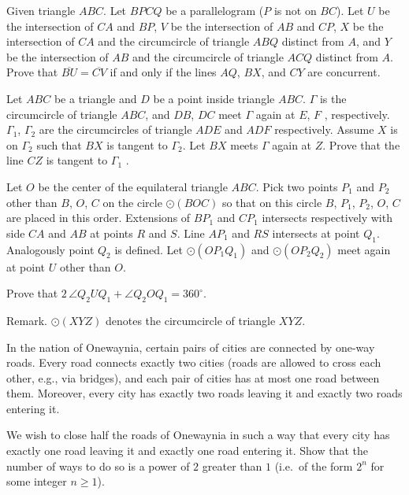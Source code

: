 \documentclass[11pt]{scrartcl}
\begin{document}
\begin{problem}[302438226120877]
	Given triangle $ABC$. Let $BPCQ$ be a parallelogram ($P$ is not on $BC$). Let $U$ be the intersection of $CA$ and $BP$, $V$ be the intersection of $AB$ and $CP$, $X$ be the intersection of $CA$ and the circumcircle of triangle $ABQ$ distinct from $A$, and $Y$ be the intersection of $AB$ and the circumcircle of triangle $ACQ$ distinct from $A$.
Prove that $\overline{BU} = \overline{CV}$ if and only if the lines $AQ$, $BX$, and $CY$ are concurrent.
\end{problem}
\begin{problem}[6209707374283278028]
Let $ABC$ be a triangle and $D$ be a point inside triangle $ABC$. $\Gamma$ is the circumcircle of triangle $ABC$, and $DB$, $DC$ meet $\Gamma$ again at $E$, $F$ , respectively. $\Gamma_1$, $\Gamma_2$ are the circumcircles of triangle $ADE$ and $ADF$ respectively. Assume $X$ is on $\Gamma_2$ such that $BX$ is tangent to $\Gamma_2$. Let $BX$ meets $\Gamma$ again at $Z$. Prove that the line $CZ$ is tangent to $\Gamma_1$ .
\end{problem}
\begin{problem}[518384374486289]
	Let $O$ be the center of the equilateral triangle $ABC$. Pick two points $P_1$ and $P_2$ other than $B$, $O$, $C$ on the circle $\odot(BOC)$ so that on this circle $B$, $P_1$, $P_2$, $O$, $C$ are placed in this order. Extensions of $BP_1$ and $CP_1$ intersects respectively with side $CA$ and $AB$ at points $R$ and $S$. Line $AP_1$ and $RS$ intersects at point $Q_1$. Analogously point $Q_2$ is defined. Let $\odot(OP_1Q_1)$ and $\odot(OP_2Q_2)$ meet again at point $U$ other than $O$.

Prove that $2\,\angle Q_2UQ_1 + \angle Q_2OQ_1 = 360^\circ$.

Remark. $\odot(XYZ)$ denotes the circumcircle of triangle $XYZ$.
\end{problem}
\begin{problem}[913214378150707]
In the nation of Onewaynia, certain pairs of cities are connected by one-way roads. Every road connects exactly two cities (roads are allowed to cross each other, e.g., via bridges), and each pair of cities has at most one road between them. Moreover, every city has exactly two roads leaving it and exactly two roads entering it.

We wish to close half the roads of Onewaynia in such a way that every city has exactly one road leaving it and exactly one road entering it. Show that the number of ways to do so is a power of $2$ greater than $1$ (i.e.\ of the form $2^n$ for some integer $n \ge 1$).
\end{problem}
\end{document}
